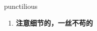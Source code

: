 
\begin{frame}
{\huge punctilious}
\begin{center}
\begin{enumerate}\Large
  \item \textbf{注意细节的，一丝不苟的}
\end{enumerate}
\end{center}
\end{frame}
